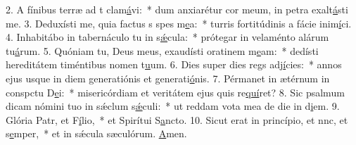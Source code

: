 2. A fínibus terræ ad t clam\uline{á}vi:~* dum anxiarétur cor meum, in petra exalt\uline{á}sti me.
3. Deduxísti me, quia factus s spes m\uline{e}a:~* turris fortitúdinis a fácie inim\uline{í}ci.
4. Inhabitábo in tabernáculo tu in s\uline{ǽ}cula:~* prótegar in velaménto alárum tu\uline{á}rum.
5. Quóniam tu, Deus meus, exaudísti oratinem m\uline{e}am:~* dedísti hereditátem timéntibus nomen t\uline{u}um.
6. Dies super dies regs adj\uline{í}cies:~* annos ejus usque in diem generatiónis et generati\uline{ó}nis.
7. Pérmanet in ætérnum in conspctu D\uline{e}i:~* misericórdiam et veritátem ejus quis re\uline{quí}ret?
8. Sic psalmum dicam nómini tuo in sǽclum s\uline{ǽ}culi:~* ut reddam vota mea de die in d\uline{i}em.
9. Glória Patr, et F\uline{í}lio,~* et Spirítui S\uline{a}ncto.
10. Sicut erat in princípio, et nnc, et s\uline{e}mper,~* et in sǽcula sæculórum. \uline{A}men.
